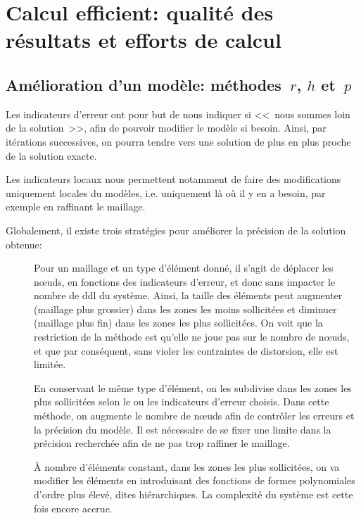 \chapter{Calcul efficient: qualité des résultats et efforts de calcul}\label{Ch-Amelio}


\medskip
\section{Amélioration d'un modèle: méthodes~$r$, $h$ et~$p$}\label{Sec-rhp}

Les indicateurs d'erreur ont pour but de nous indiquer si <<~nous sommes loin de
la solution~>>, afin de pouvoir modifier le modèle si besoin.
Ainsi, par itérations successives, on pourra tendre vers une solution
de plus en plus proche de la solution exacte.

Les indicateurs locaux nous permettent notamment de faire des modifications uniquement
locales du modèles, i.e. uniquement là où il y en a besoin, par exemple en
raffinant le maillage.

\medskip
Globalement, il existe trois stratégies pour améliorer la précision de la
solution obtenue:
\begin{description}
\item[] Pour un maillage et un type d'élément donné, il s'agit de déplacer les nœuds, en fonctions des indicateurs d'erreur, et donc sans impacter le nombre de ddl du système. Ainsi, la taille des éléments peut augmenter (maillage plus grossier) dans les zones les moins sollicitées et diminuer (maillage plus fin) dans les zones les plus sollicitées. On voit que la restriction de la méthode est qu'elle ne joue pas sur le nombre de nœuds, et que par conséquent, sans violer les contraintes de distorsion, elle est limitée.
\item[] En conservant le même type d'élément, on les subdivise dans les zones les plus sollicitées selon le ou les indicateurs d'erreur choisis. Dans cette méthode, on augmente le nombre de nœuds afin de contrôler les erreurs et la précision du modèle. Il est nécessaire de se fixer une limite dans la précision recherchée afin de ne pas trop raffiner le maillage.
\item[] À nombre d'éléments constant, dans les zones les plus sollicitées, on va modifier les éléments en introduisant des fonctions de formes polynomiales d'ordre plus élevé, dites hiérarchiques. La complexité du système est cette fois encore accrue.
\end{description}

